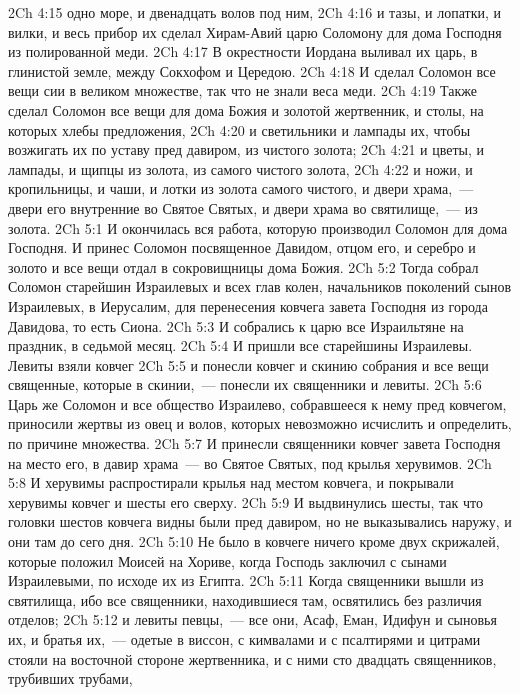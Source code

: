 \vs 2Ch 4:15 одно море, и двенадцать волов под ним,
\vs 2Ch 4:16 и тазы, и лопатки, и вилки, и весь прибор их сделал Хирам-Авий царю Соломону для дома Господня из полированной меди.
\vs 2Ch 4:17 В окрестности Иордана выливал их царь, в глинистой земле, между Сокхофом и Цередою.
\vs 2Ch 4:18 И сделал Соломон все вещи сии в великом множестве, так что не знали веса меди.
\vs 2Ch 4:19 Также сделал Соломон все вещи для дома Божия и золотой жертвенник, и столы, на которых хлебы предложения,
\vs 2Ch 4:20 и светильники и лампады их, чтобы возжигать их по уставу пред давиром, из чистого золота;
\vs 2Ch 4:21 и цветы, и лампады, и щипцы из золота, из самого чистого золота,
\vs 2Ch 4:22 и ножи, и кропильницы, и чаши, и лотки из золота самого чистого, и двери храма,~--- двери его внутренние во Святое Святых, и двери храма во святилище,~--- из золота.
\vs 2Ch 5:1 И окончилась вся работа, которую производил Соломон для дома Господня. И принес Соломон посвященное Давидом, отцом его, и серебро и золото и все вещи отдал в сокровищницы дома Божия.
\rsbpar\vs 2Ch 5:2 Тогда собрал Соломон старейшин Израилевых и всех глав колен, начальников поколений сынов Израилевых, в Иерусалим, для перенесения ковчега завета Господня из города Давидова, то есть  Сиона.
\vs 2Ch 5:3 И собрались к царю все Израильтяне на праздник, в седьмой месяц.
\vs 2Ch 5:4 И пришли все старейшины Израилевы. Левиты взяли ковчег
\vs 2Ch 5:5 и понесли ковчег и скинию собрания и все вещи священные, которые в скинии,~--- понесли их священники и левиты.
\vs 2Ch 5:6 Царь же Соломон и все общество Израилево, собравшееся к нему пред ковчегом, приносили жертвы из овец и волов, которых невозможно исчислить и определить, по причине множества.
\vs 2Ch 5:7 И принесли священники ковчег завета Господня на место его, в давир храма~--- во Святое Святых, под крылья херувимов.
\vs 2Ch 5:8 И херувимы распростирали крылья над местом ковчега, и покрывали херувимы ковчег и шесты его сверху.
\vs 2Ch 5:9 И выдвинулись шесты, так что головки шестов ковчега видны были пред давиром, но не выказывались наружу, и они там до сего дня.
\vs 2Ch 5:10 Не было в ковчеге ничего кроме двух скрижалей, которые положил Моисей на Хориве, когда Господь заключил  с сынами Израилевыми, по исходе их из Египта.
\vs 2Ch 5:11 Когда священники вышли из святилища, ибо все священники, находившиеся там, освятились без различия отделов;
\vs 2Ch 5:12 и левиты певцы,~--- все они,  Асаф, Еман, Идифун и сыновья их, и братья их,~--- одетые в виссон, с кимвалами и с псалтирями и цитрами стояли на восточной стороне жертвенника, и с ними сто двадцать священников, трубивших трубами,
